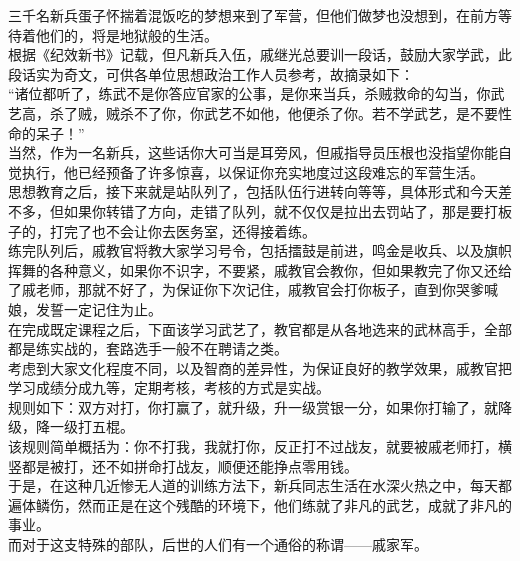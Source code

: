 \begin{multicols}{\theparacolNo}
三千名新兵蛋子怀揣着混饭吃的梦想来到了军营，但他们做梦也没想到，在前方等待着他们的，将是地狱般的生活。\\

根据《纪效新书》记载，但凡新兵入伍，戚继光总要训一段话，鼓励大家学武，此段话实为奇文，可供各单位思想政治工作人员参考，故摘录如下：\\

“诸位都听了，练武不是你答应官家的公事，是你来当兵，杀贼救命的勾当，你武艺高，杀了贼，贼杀不了你，你武艺不如他，他便杀了你。若不学武艺，是不要性命的呆子！”\\

当然，作为一名新兵，这些话你大可当是耳旁风，但戚指导员压根也没指望你能自觉执行，他已经预备了许多惊喜，以保证你充实地度过这段难忘的军营生活。\\

思想教育之后，接下来就是站队列了，包括队伍行进转向等等，具体形式和今天差不多，但如果你转错了方向，走错了队列，就不仅仅是拉出去罚站了，那是要打板子的，打完了也不会让你去医务室，还得接着练。\\

练完队列后，戚教官将教大家学习号令，包括擂鼓是前进，鸣金是收兵、以及旗帜挥舞的各种意义，如果你不识字，不要紧，戚教官会教你，但如果教完了你又还给了戚老师，那就不好了，为保证你下次记住，戚教官会打你板子，直到你哭爹喊娘，发誓一定记住为止。\\

在完成既定课程之后，下面该学习武艺了，教官都是从各地选来的武林高手，全部都是练实战的，套路选手一般不在聘请之类。\\

考虑到大家文化程度不同，以及智商的差异性，为保证良好的教学效果，戚教官把学习成绩分成九等，定期考核，考核的方式是实战。\\

规则如下：双方对打，你打赢了，就升级，升一级赏银一分，如果你打输了，就降级，降一级打五棍。\\

该规则简单概括为：你不打我，我就打你，反正打不过战友，就要被戚老师打，横竖都是被打，还不如拼命打战友，顺便还能挣点零用钱。\\

于是，在这种几近惨无人道的训练方法下，新兵同志生活在水深火热之中，每天都遍体鳞伤，然而正是在这个残酷的环境下，他们练就了非凡的武艺，成就了非凡的事业。\\

而对于这支特殊的部队，后世的人们有一个通俗的称谓——戚家军。\\


\end{multicols}
